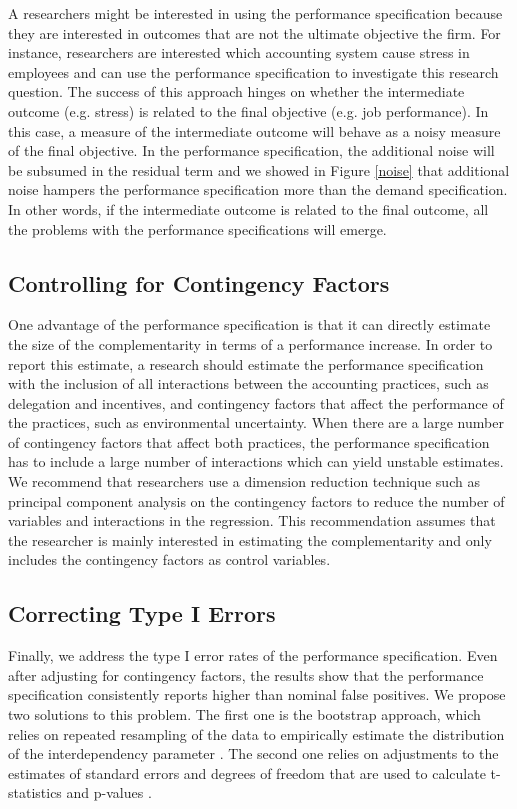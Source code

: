 \documentclass[12pt]{article}
\begin{document}
A researchers might be interested in using the performance specification because they are interested in outcomes that are not the ultimate objective the firm. For instance, researchers are interested which accounting system cause stress in employees\citep{shields_design_2000} and can use the performance specification to investigate this research question. The success of this approach hinges on whether the intermediate outcome (e.g. stress) is related to the final objective (e.g. job performance). In this case, a measure of the intermediate outcome will behave as a noisy measure of the final objective. In the performance specification, the additional noise will be subsumed in the residual term and we showed in Figure \ref{noise} that additional noise hampers the performance specification more than the demand specification. In other words, if the intermediate outcome is related to the final outcome, all the problems with the performance specifications will emerge. 

\subsection{Controlling for Contingency Factors}

One advantage of the performance specification is that it can directly estimate the size of the complementarity in terms of a performance increase. In order to report this estimate, a research should estimate the performance specification with the inclusion of all interactions between the accounting practices, such as delegation and incentives, and contingency factors that affect the performance of the practices, such as environmental uncertainty. When there are a large number of contingency factors that affect both practices, the performance specification has to include a large number of interactions which can yield unstable estimates. We recommend that researchers use a dimension reduction technique such as principal component analysis on the contingency factors to reduce the number of variables and interactions in the regression. This recommendation assumes that the researcher is mainly interested in estimating the complementarity and only includes the contingency factors as control variables.

\subsection{Correcting Type I Errors}

Finally, we address the type I error rates of the performance specification. Even after adjusting for contingency factors, the results show that the performance specification consistently reports higher than nominal false positives. We propose two solutions to this problem. The first one is the bootstrap approach, which relies on repeated resampling of the data to empirically estimate the distribution of the interdependency parameter \citep{efron_computer_2017}. The second one relies on adjustments to the estimates of standard errors and degrees of freedom that are used to calculate t-statistics and p-values \citep{young_improved_2016}.
\end{document}
